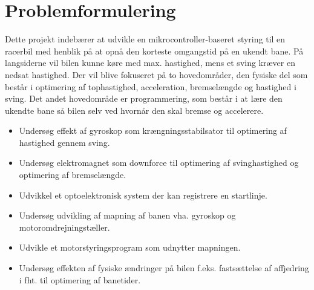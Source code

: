 
\section{Problemformulering}
Dette projekt indebærer at udvikle en mikrocontroller-baseret styring til en racerbil med henblik på at opnå den korteste omgangstid på en ukendt bane. På langsiderne vil bilen kunne køre med max. hastighed, mens et sving kræver en nedsat hastighed. Der vil blive fokuseret på to hovedområder, den fysiske del som består i optimering af tophastighed, acceleration, bremselængde og hastighed i sving. Det andet hovedområde er programmering, som består i at lære den ukendte bane så bilen selv ved hvornår den skal bremse og accelerere.
\begin{itemize}
\item Undersøg effekt af gyroskop som krængningsstabilsator til optimering af hastighed gennem sving.
\item Undersøg elektromagnet som downforce til optimering af svinghastighed og optimering af bremselængde.
\item Udvikkel et optoelektronisk system der kan registrere en startlinje.
\item Undersøg udvikling af mapning af banen vha. gyroskop og motoromdrejningstæller.
\item Udvikle et motorstyringsprogram som udnytter mapningen.
\item Undersøg effekten af fysiske ændringer på bilen f.eks. fastsættelse af affjedring i fht. til optimering af banetider.
\end{itemize}
